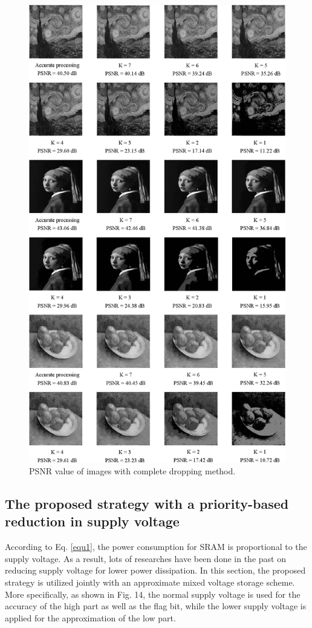 \documentclass[lettersize,journal]{IEEEtran}
\begin{document}
\begin{figure}[htb]
	\centering
	\includegraphics[width=\linewidth]{Fig/PSNR value of images with complete dropping method.png}
	{\color{red}\caption{PSNR value of images with complete dropping method.}}
	\label{fig13}
\end{figure}


\subsection{The proposed strategy with a priority-based reduction in supply voltage}
According to Eq. \eqref{equ1}, the power consumption for SRAM is proportional to the supply voltage. As a result, lots of researches have been done in the past on reducing supply voltage for lower power dissipation. In this section, the proposed strategy is utilized jointly with an approximate mixed voltage storage scheme. More specifically, as shown in Fig. 14, the normal supply voltage is used for the accuracy of the high part as well as the flag bit, while the lower supply voltage is applied for the approximation of the low part. 
\end{document}
